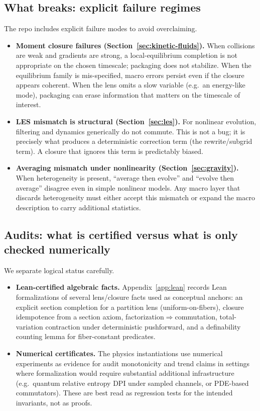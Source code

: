 \documentclass[11pt]{article}
\begin{document}
\subsection{What breaks: explicit failure regimes}
The repo includes explicit failure modes to avoid overclaiming.
\begin{itemize}
  \item \textbf{Moment closure failures (Section~\ref{sec:kinetic-fluids}).} When collisions are weak and gradients are strong, a local-equilibrium completion is not appropriate on the chosen timescale; packaging does not stabilize. When the equilibrium family is mis-specified, macro errors persist even if the closure appears coherent. When the lens omits a slow variable (e.g.\ an energy-like mode), packaging can erase information that matters on the timescale of interest.

  \item \textbf{LES mismatch is structural (Section~\ref{sec:les}).} For nonlinear evolution, filtering and dynamics generically do not commute. This is not a bug; it is precisely what produces a deterministic correction term (the rewrite/subgrid term). A closure that ignores this term is predictably biased.

  \item \textbf{Averaging mismatch under nonlinearity (Section~\ref{sec:gravity}).} When heterogeneity is present, ``average then evolve'' and ``evolve then average'' disagree even in simple nonlinear models. Any macro layer that discards heterogeneity must either accept this mismatch or expand the macro description to carry additional statistics.
\end{itemize}

\subsection{Audits: what is certified versus what is only checked numerically}
We separate logical status carefully.
\begin{itemize}
  \item \textbf{Lean-certified algebraic facts.} Appendix~\ref{app:lean} records Lean formalizations of several lens/closure facts used as conceptual anchors: an explicit section completion for a partition lens (uniform-on-fibers), closure idempotence from a section axiom, factorization$\Rightarrow$commutation, total-variation contraction under deterministic pushforward, and a definability counting lemma for fiber-constant predicates.

  \item \textbf{Numerical certificates.} The physics instantiations use numerical experiments as evidence for audit monotonicity and trend claims in settings where formalization would require substantial additional infrastructure (e.g.\ quantum relative entropy DPI under sampled channels, or PDE-based commutators). These are best read as regression tests for the intended invariants, not as proofs.
\end{itemize}
\end{document}
